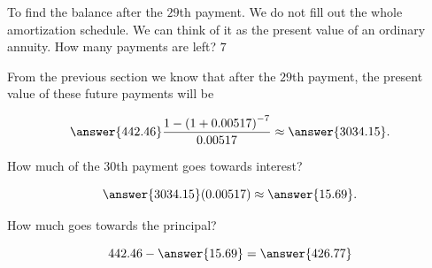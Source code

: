 \begin{problem}
\begin{problem}
    To find the balance after the \(29\)th payment. We do not fill out the whole amortization schedule. We can think of it as the present value of an ordinary annuity. How many payments are left? \(7\)

    From the previous section we know that after the \(29\)th payment, the present value of these future payments will be

    \[\answer{442.46} \frac{1-\left(1+0.00517\right)^{-7}}{0.00517} \approx \answer{3034.15}.\]

    How much of the \(30\)th payment goes towards interest?

    \[\answer{3034.15} (0.00517) \approx \answer{15.69}.\]

    How much goes towards the principal?

    \[442.46 - \answer{15.69} = \answer{426.77}\]
\end{problem}
\end{problem}